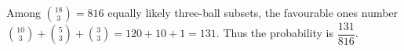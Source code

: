 Among $\binom{18}{3}=816 $ equally likely three-ball subsets, the favourable ones number $\binom{10}{3}+\binom53+\binom33=120+10+1=131 $. Thus the probability is $\boxed{\dfrac{131}{816}}$.
